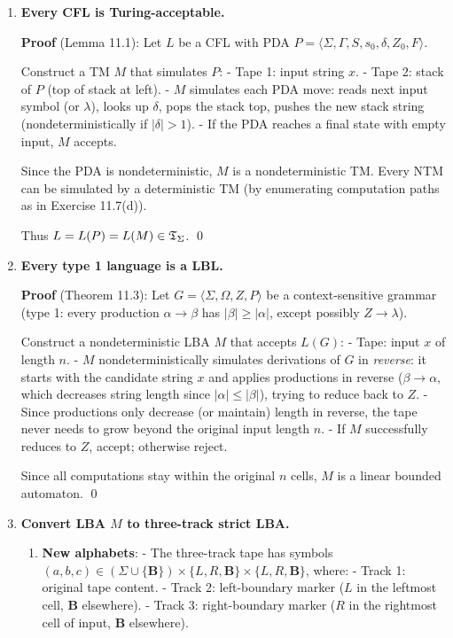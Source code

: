 \begin{enumerate}[{11.}1. ]
\item \textbf{Every CFL is Turing-acceptable.}

\textbf{Proof} (Lemma 11.1): Let $L$ be a CFL with PDA $P = \langle\Sigma,\Gamma,S,s_0,\delta,Z_0,F\rangle$.

Construct a TM $M$ that simulates $P$:
- Tape 1: input string $x$.
- Tape 2: stack of $P$ (top of stack at left).
- $M$ simulates each PDA move: reads next input symbol (or $\lambda$), looks up $\delta$, pops the stack top, pushes the new stack string (nondeterministically if $|\delta|>1$).
- If the PDA reaches a final state with empty input, $M$ accepts.

Since the PDA is nondeterministic, $M$ is a nondeterministic TM. Every NTM can be simulated by a deterministic TM (by enumerating computation paths as in Exercise 11.7(d)).

Thus $L = L(P) = L(M) \in \mathfrak{T}_\Sigma$. \qed

\item \textbf{Every type 1 language is a LBL.}

\textbf{Proof} (Theorem 11.3): Let $G=\langle\Sigma,\Omega,Z,P\rangle$ be a context-sensitive grammar (type 1: every production $\alpha\to\beta$ has $|\beta|\geq|\alpha|$, except possibly $Z\to\lambda$).

Construct a nondeterministic LBA $M$ that accepts $L(G)$:
- Tape: input $x$ of length $n$.
- $M$ nondeterministically simulates derivations of $G$ in \emph{reverse}: it starts with the candidate string $x$ and applies productions in reverse ($\beta \to \alpha$, which decreases string length since $|\alpha|\leq|\beta|$), trying to reduce back to $Z$.
- Since productions only decrease (or maintain) length in reverse, the tape never needs to grow beyond the original input length $n$.
- If $M$ successfully reduces to $Z$, accept; otherwise reject.

Since all computations stay within the original $n$ cells, $M$ is a linear bounded automaton. \qed

\item \textbf{Convert LBA $M$ to three-track strict LBA.}

\begin{enumerate}
\item \textbf{New alphabets}:
- The three-track tape has symbols $(a, b, c) \in (\Sigma\cup\{\pmb{B}\}) \times \{L,R,\pmb{B}\} \times \{L,R,\pmb{B}\}$, where:
  - Track 1: original tape content.
  - Track 2: left-boundary marker ($L$ in the leftmost cell, $\pmb{B}$ elsewhere).
  - Track 3: right-boundary marker ($R$ in the rightmost cell of input, $\pmb{B}$ elsewhere).


\end{enumerate}
\end{enumerate}
